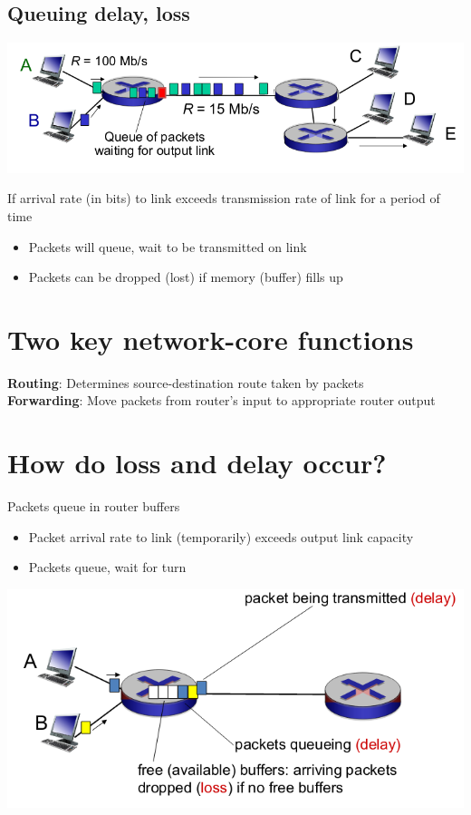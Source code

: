 \documentclass{article}[18pt]
\begin{document}
\subsection{Queuing delay, loss}
\begin{center}
	\includegraphics[scale=0.7]{queue}
\end{center}
If arrival rate (in bits) to link exceeds transmission rate of link for a period of time
\begin{itemize}
	\item Packets will queue, wait to be transmitted on link
	\item Packets can be dropped (lost) if memory (buffer) fills up
\end{itemize}
\section{Two key network-core functions}
\textbf{Routing}: Determines source-destination route taken by packets\\
\textbf{Forwarding}: Move packets from router's input to appropriate router output
\section{How do loss and delay occur?}
Packets queue in router buffers
\begin{itemize}
	\item Packet arrival rate to link (temporarily) exceeds output link capacity
	\item Packets queue, wait for turn
\end{itemize}
\begin{center}
	\includegraphics[scale=0.7]{loss}
\end{center}
\end{document}
